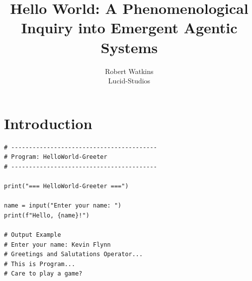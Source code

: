 \documentclass[twocolumn,10pt]{article}
\title{Hello World: A Phenomenological Inquiry into Emergent Agentic Systems}
\author{Robert Watkins \\
Lucid-Studios}
\date{}
\begin{document}
\maketitle

\section*{Introduction}

\begin{lstlisting}[style=mypython, caption={HelloWorld-Greeter Program}]
# -----------------------------------------
# Program: HelloWorld-Greeter
# -----------------------------------------

print("=== HelloWorld-Greeter ===")

name = input("Enter your name: ")
print(f"Hello, {name}!")

# Output Example
# Enter your name: Kevin Flynn
# Greetings and Salutations Operator...
# This is Program...
# Care to play a game?
\end{lstlisting}
\end{document}
